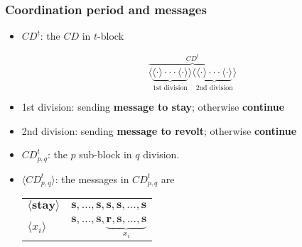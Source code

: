 \documentclass[9pt]{beamer}
\begin{document}
\begin{frame}
\frametitle{Coordination period and messages}



\begin{itemize}
\item $CD^t$: the $CD$ in $t$-block

\[\overbrace{\langle\underbrace{\langle \cdot \rangle \cdot \cdot \cdot \langle \cdot \rangle}_{\text{1st division}}\rangle \langle\underbrace{\langle \cdot \rangle \cdot \cdot \cdot \langle \cdot \rangle}_{\text{2nd division}} \rangle }^{CD^t}\] 


\item 1st division: sending \textbf{message to stay}; otherwise \textbf{continue}
\item 2nd division: sending \textbf{message to revolt}; otherwise \textbf{continue}

\pause

\item $CD^t_{p,q}$: the $p$ sub-block in $q$ division.
\item $\langle CD^t_{p,q} \rangle$: the messages in $CD^t_{p,q}$ are 
\begin{table}[h]
\begin{tabular}{l l}
$\langle \textbf{stay} \rangle$ & $\textbf{s},...,\textbf{s},\textbf{s},\textbf{s},...,\textbf{s}$  \\
$\langle x_i\rangle$ & $\textbf{s},...,\textbf{s},\underbrace{\textbf{r},\textbf{s},...,\textbf{s}}_{x_i}$ \\
\end{tabular}
\end{table}

\end{itemize}



\end{frame}
\end{document}
